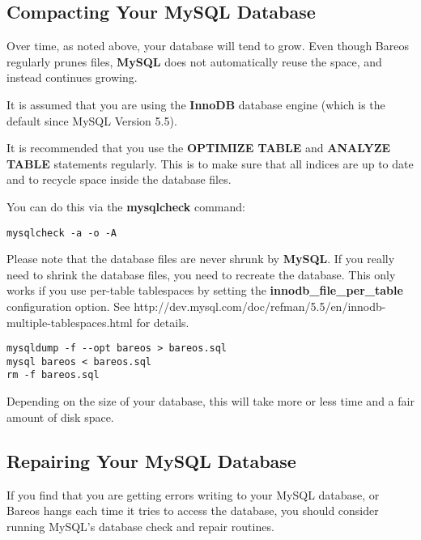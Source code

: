 \subsection{Compacting Your MySQL Database}

Over time, as noted above, your database will tend to grow.
Even though Bareos regularly prunes files, {\bf MySQL} does not automatically
reuse the space, and instead continues growing.

It is assumed that you are using the {\bf InnoDB} database engine (which is the default since MySQL Version 5.5).

It is recommended that you use the {\bf OPTIMIZE TABLE} and {\bf ANALYZE TABLE}
statements regularly. This is to make sure that all indices are up to date
and to recycle space inside the database files.


You can do this via the {\bf mysqlcheck} command:
\footnotesize
\begin{verbatim}
mysqlcheck -a -o -A
\end{verbatim}
\normalsize

Please note that the database files are never shrunk by {\bf MySQL}. If you really need to shrink the database files, you need to recreate the database. This only works if you use per-table tablespaces by setting the {\bf innodb\_file\_per\_table} configuration option.
See
{http://dev.mysql.com/doc/refman/5.5/en/innodb-multiple-tablespaces.html} for details.

\footnotesize
\begin{verbatim}
mysqldump -f --opt bareos > bareos.sql
mysql bareos < bareos.sql
rm -f bareos.sql
\end{verbatim}
\normalsize

Depending on the size of your database, this will take more or less time and a
fair amount of disk space.

\label{DatabaseRepair}
\label{RepairingMySQL}
\subsection{Repairing Your MySQL Database}

If you find that you are getting errors writing to your MySQL database, or
Bareos hangs each time it tries to access the database, you should consider
running MySQL's database check and repair routines.

